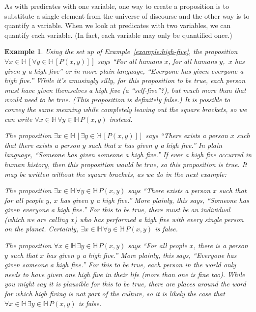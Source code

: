 \documentclass{book}
\newcounter{ekcounter}%
\theoremstyle{ekimcustom}
\newtheorem{example}[ekcounter]{Example}
\begin{document}
As with predicates with one variable, one way to create a proposition is to substitute a single element from the universe of discourse and the other way is to quantify a variable. When we look at predicates with two variables, we can quantify each variable. (In fact, each variable may only be quantified once.)
\begin{example}
Using the set up of Example~\ref{example:high-five}, the proposition $\forall x \in \mathbb{H}\,[\forall y \in \mathbb{H}\,[P(x,y)]]$ says ``For all humans $x$, for all humans $y$,\, $x$ has given $y$ a high five'' or in more plain language, ``Everyone has given everyone a high five.'' While it's amusingly silly, for this proposition to be true, each person must have given themselves a high five (a ``self-five''?), but much more than that would need to be true. (This proposition is definitely false.) It is possible to convey the same meaning while completely leaving out the square brackets, so we can write $\forall x \in \mathbb{H}\,\forall y \in \mathbb{H}\,P(x,y)$ instead.

The proposition $\exists x \in \mathbb{H}\,[\exists y \in \mathbb{H}\,[P(x,y)]]$ says ``There exists a person $x$ such that there exists a person $y$ such that $x$ has given $y$ a high five.'' In plain language, ``Someone has given someone a high five.'' If ever a high five occurred in human history, then this proposition would be true, so this proposition is true. It may be written without the square brackets, as we do in the next example:

The proposition $\exists x \in \mathbb{H}\,\forall y \in \mathbb{H}\,P(x,y)$ says ``There exists a person $x$ such that for all people $y$, $x$ has given $y$ a high five.''  More plainly, this says, ``Someone has given everyone a high five.'' For this to be true, there must be an individual (which we are calling $x$) who has performed a high five with \emph{every} single person on the planet. Certainly, $\exists x \in \mathbb{H}\,\forall y \in \mathbb{H}\,P(x,y)$ is false.

The proposition $\forall x \in \mathbb{H}\,\exists y \in \mathbb{H}\,P(x,y)$ says ``For all people $x$, there is a person $y$ such that  $x$ has given $y$ a high five.''  More plainly, this says, ``Everyone has given someone a high five.'' For this to be true, each person in the world only needs to have given one high five in their life (more than one is fine too). While you might say it is plausible for this to be true, there are places around the word for which high fiving is not part of the culture, so it is likely the case that $\forall x \in \mathbb{H}\,\exists y \in \mathbb{H}\,P(x,y)$ is false.
\end{example}\label{example:switch-quant}
\end{document}
